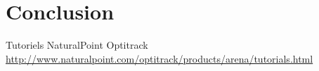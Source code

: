 \documentclass{article}[11pt]
\begin{document}
\section{Conclusion}


\begin{thebibliography}{}
  Tutoriels NaturalPoint Optitrack \\
  \url{http://www.naturalpoint.com/optitrack/products/arena/tutorials.html}

\end{thebibliography} 
\end{document}

